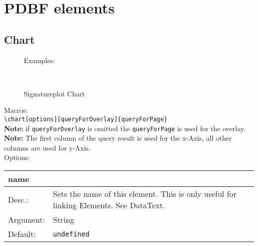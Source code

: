 \documentclass[11pt]{article}
\def\a{5cm}
\def\b{10.5cm}
\def\option#1#2#3#4{%
\noindent \begin{tabular}{|p{\a}|p{\b}|}
\hline
\textbf{#1} & \\
\hline
Desc.: & #2 \\
\hline
Argument: & #3\\
\hline
Default:& #4\\
\hline
\end{tabular} \\[4pt]%
}
\begin{document}
\section{PDBF elements}
\subsection{Chart}
\begin{figure}[h!]%
\hspace{-218pt}Examples:\\
    \centering
    \begin{minipage}{.48\textwidth}
    \caption{Line Chart}
    \end{minipage}
    \hspace{11pt}
    \begin{minipage}{.48\textwidth}
    \caption{Bar Chart}
    \end{minipage} \\[8pt]
    
    \begin{minipage}{1.0\textwidth}
    \caption{Signatureplot Chart}
    \end{minipage}
\end{figure}

\newpage
\noindent Macros: \\[3pt]
\verb|\chart[options][queryForOverlay]{queryForPage}| \\
\textbf{Note:} if \verb|queryForOverlay| is omitted the \verb|queryForPage| is used for the overlay.\\
\textbf{Note:} The first column of the query result is used for the x-Axis, all other columns are used for y-Axis.\\[8pt] 
\noindent Options:\\[3pt]
%
\option
{name}
{Sets the name of this element. This is only useful for linking Elements. See DataText.}
{String}
{\texttt{undefined}}
\end{document}
